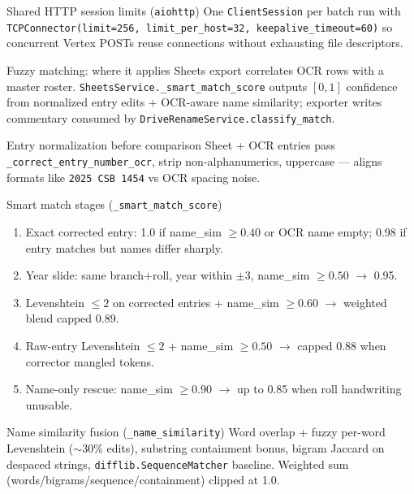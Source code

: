 \documentclass[aspectratio=169]{beamer}
\begin{document}
\begin{frame}{Shared HTTP session limits (\texttt{aiohttp})}
  \small
  One \texttt{ClientSession} per batch run with \texttt{TCPConnector(limit=256, limit\_per\_host=32, keepalive\_timeout=60)} so concurrent Vertex POSTs reuse connections without exhausting file descriptors.
\end{frame}

\begin{frame}{Fuzzy matching: where it applies}
  \small
  Sheets export correlates OCR rows with a master roster. \texttt{SheetsService.\_smart\_match\_score} outputs $[0,1]$ confidence from normalized entry edits + OCR-aware name similarity; exporter writes commentary consumed by \texttt{DriveRenameService.classify\_match}.
\end{frame}

\begin{frame}{Entry normalization before comparison}
  \small
  Sheet + OCR entries pass \texttt{\_correct\_entry\_number\_ocr}, strip non-alphanumerics, uppercase --- aligns formats like \texttt{2025 CSB 1454} vs OCR spacing noise.
\end{frame}

\begin{frame}{Smart match stages (\texttt{\_smart\_match\_score})}
  \tiny
  \begin{enumerate}\setlength\itemsep{0.12em}
    \item Exact corrected entry: 1.0 if name\_sim $\geq 0.40$ or OCR name empty; 0.98 if entry matches but names differ sharply.
    \item Year slide: same branch+roll, year within $\pm 3$, name\_sim $\geq 0.50$ $\rightarrow$ 0.95.
    \item Levenshtein $\leq 2$ on corrected entries + name\_sim $\geq 0.60$ $\rightarrow$ weighted blend capped 0.89.
    \item Raw-entry Levenshtein $\leq 2$ + name\_sim $\geq 0.50$ $\rightarrow$ capped 0.88 when corrector mangled tokens.
    \item Name-only rescue: name\_sim $\geq 0.90$ $\rightarrow$ up to 0.85 when roll handwriting unusable.
  \end{enumerate}
\end{frame}

\begin{frame}{Name similarity fusion (\texttt{\_name\_similarity})}
  \tiny
  Word overlap + fuzzy per-word Levenshtein ($\sim$30\% edits), substring containment bonus, bigram Jaccard on despaced strings, \texttt{difflib.SequenceMatcher} baseline. Weighted sum (words/bigrams/sequence/containment) clipped at 1.0.
\end{frame}
\end{document}
